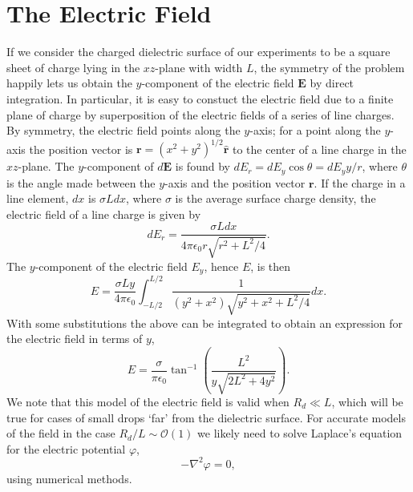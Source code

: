 \documentclass[12pt,a4paper,oneside]{book}
\begin{document}
\section{The Electric Field}
If we consider the charged dielectric surface of our experiments to be a square sheet of charge lying in the $xz$-plane with width $L$, the symmetry of the problem happily lets us obtain the $y$-component of the electric field $\mathbf{E}$ by direct integration. In particular, it is easy to constuct the electric field due to a finite plane of charge by superposition of the electric fields of a series of line charges. By symmetry, the electric field points along the $y$-axis; for a point along the $y$-axis the position vector is $\mathbf{r} = \left( x^2 + y^2 \right)^{1/2} \hat{\mathbf{r}}$ to the center of a line charge in the $xz$-plane. The $y$-component of $d\mathbf{E}$ is found by $d E_r = d E_y \cos \theta = d E_y y/ r$, where $\theta$ is the angle made between the $y$-axis and the position vector $\mathbf{r}$. If the charge in a line element, $dx$ is $\sigma L dx$, where $\sigma$ is the average surface charge density, the electric field of a line charge is given by\cite{david_j._griffiths_introduction_1999}
\[d E_r = \frac{\sigma L dx}{4 \pi \epsilon_0 r \sqrt{r^2 + L^2/4}}.
\]
The $y$-component of the electric field $E_y$, hence $E$, is then
\[ E = \frac{\sigma L y }{4 \pi \epsilon_0} \int^{L/2}_{-L/2} \frac{1}{(y^2 + x^2) \sqrt{y^2 + x^2 + L^2/4}} dx 
.\]
With some substitutions the above can be integrated to obtain an expression for the electric field in terms of $y$, 
\begin{equation}
\label{e_field}
E = \frac{\sigma}{ \pi \epsilon_0} \tan^{-1} \left( \frac{L^2}{y \sqrt{2L^2 + 4y^2}}\right)
.\end{equation}
We note that this model of the electric field is valid when $R_d \ll L$, which will be true for cases of small drops `far' from the dielectric surface. For accurate models of the field in the case $R_d/L \sim \mathcal{O}(1)$ we likely need to solve Laplace's equation for the electric potential $\varphi$,
\[ - \nabla^2 \varphi = 0,\]
using numerical methods.
\end{document}
